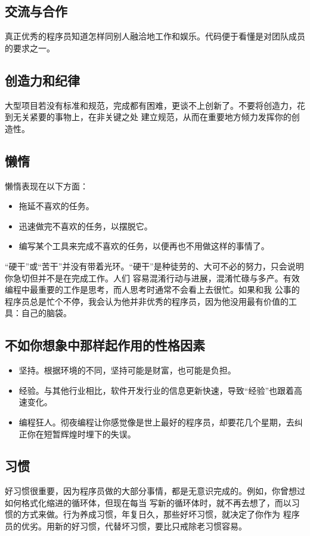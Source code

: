 \documentclass{article}
\begin{document}
\subsection{交流与合作}
真正优秀的程序员知道怎样同别人融洽地工作和娱乐。代码便于看懂是对团队成员的要求之一。

\subsection{创造力和纪律}
大型项目若没有标准和规范，完成都有困难，更谈不上创新了。不要将创造力，花到无关紧要的事物上，在非关键之处
建立规范，从而在重要地方倾力发挥你的创造性。

\subsection{懒惰}
懒惰表现在以下方面：
\begin{itemize}
    \item 拖延不喜欢的任务。
    \item 迅速做完不喜欢的任务，以摆脱它。
    \item 编写某个工具来完成不喜欢的任务，以便再也不用做这样的事情了。
\end{itemize}
“硬干”或“苦干”并没有带着光环。“硬干”是种徒劳的、大可不必的努力，只会说明你急切但并不是在完成工作。人们
容易混淆行动与进展，混淆忙碌与多产。有效编程中最重要的工作是思考，而人思考时通常不会看上去很忙。如果和我
公事的程序员总是忙个不停，我会认为他并非优秀的程序员，因为他没用最有价值的工具：自己的脑袋。

\subsection{不如你想象中那样起作用的性格因素}
\begin{itemize}
    \item 坚持。根据环境的不同，坚持可能是财富，也可能是负担。
    \item 经验。与其他行业相比，软件开发行业的信息更新快速，导致“经验”也跟着高速变化。
    \item 编程狂人。彻夜编程让你感觉像是世上最好的程序员，却要花几个星期，去纠正你在短暂辉煌时埋下的失误。
\end{itemize}

\subsection{习惯}
好习惯很重要，因为程序员做的大部分事情，都是无意识完成的。例如，你曾想过如何格式化缩进的循环体，但现在每当
写新的循环体时，就不再去想了，而以习惯的方式来做。行为养成习惯，年复日久，那些好坏习惯，就决定了你作为
程序员的优劣。用新的好习惯，代替坏习惯，要比只戒除老习惯容易。
\end{document}
